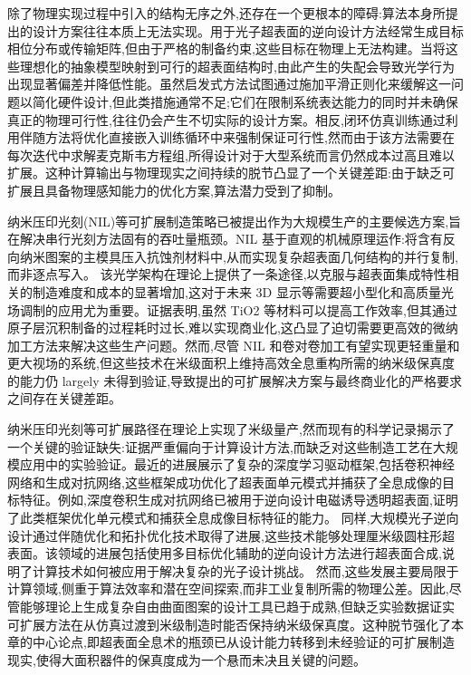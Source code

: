 除了物理实现过程中引入的结构无序之外,还存在一个更根本的障碍:算法本身所提出的设计方案往往本质上无法实现。用于光子超表面的逆向设计方法经常生成目标相位分布或传输矩阵,但由于严格的制备约束,这些目标在物理上无法构建。当将这些理想化的抽象模型映射到可行的超表面结构时,由此产生的失配会导致光学行为出现显著偏差并降低性能。虽然启发式方法试图通过施加平滑正则化来缓解这一问题以简化硬件设计,但此类措施通常不足;它们在限制系统表达能力的同时并未确保真正的物理可行性,往往仍会产生不切实际的设计方案。相反,闭环仿真训练通过利用伴随方法将优化直接嵌入训练循环中来强制保证可行性,然而由于该方法需要在每次迭代中求解麦克斯韦方程组,所得设计对于大型系统而言仍然成本过高且难以扩展。这种计算输出与物理现实之间持续的脱节凸显了一个关键差距:由于缺乏可扩展且具备物理感知能力的优化方案,算法潜力受到了抑制。\citep{doi_10_48550_arxiv_2505_18377_a6fc9ec3}

纳米压印光刻(NIL)等可扩展制造策略已被提出作为大规模生产的主要候选方案,旨在解决串行光刻方法固有的吞吐量瓶颈。NIL 基于直观的机械原理运作:将含有反向纳米图案的主模具压入抗蚀剂材料中,从而实现复杂超表面几何结构的并行复制,而非逐点写入。\citep{doi_10_3390_encyclopedia5040197_fe6bfdc9} \citep{doi_10_5772_intechopen_72534_9965e900} 该光学架构在理论上提供了一条途径,以克服与超表面集成特性相关的制造难度和成本的显著增加,这对于未来 3D 显示等需要超小型化和高质量光场调制的应用尤为重要。证据表明,虽然 TiO2 等材料可以提高工作效率,但其通过原子层沉积制备的过程耗时过长,难以实现商业化,这凸显了迫切需要更高效的微纳加工方法来解决这些生产问题。然而,尽管 NIL 和卷对卷加工有望实现更轻重量和更大视场的系统,但这些技术在米级面积上维持高效全息重构所需的纳米级保真度的能力仍 largely 未得到验证,导致提出的可扩展解决方案与最终商业化的严格要求之间存在关键差距。\citep{doi_10_1515_nanoph_2025_0269_b999ce93}

纳米压印光刻等可扩展路径在理论上实现了米级量产,然而现有的科学记录揭示了一个关键的验证缺失:证据严重偏向于计算设计方法,而缺乏对这些制造工艺在大规模应用中的实验验证。最近的进展展示了复杂的深度学习驱动框架,包括卷积神经网络和生成对抗网络,这些框架成功优化了超表面单元模式并捕获了全息成像的目标特征。例如,深度卷积生成对抗网络已被用于逆向设计电磁诱导透明超表面,证明了此类框架优化单元模式和捕获全息成像目标特征的能力。\citep{doi_10_1088_1402_4896_acf007_ad71688e} 同样,大规模光子逆向设计通过伴随优化和拓扑优化技术取得了进展,这些技术能够处理厘米级圆柱形超表面。该领域的进展包括使用多目标优化辅助的逆向设计方法进行超表面合成,说明了计算技术如何被应用于解决复杂的光子设计挑战。\citep{doi_10_1117_12_2529823_81c5e659} 然而,这些发展主要局限于计算领域,侧重于算法效率和潜在空间探索,而非工业复制所需的物理公差。因此,尽管能够理论上生成复杂自由曲面图案的设计工具已趋于成熟,但缺乏实验数据证实可扩展方法在从仿真过渡到米级制造时能否保持纳米级保真度。这种脱节强化了本章的中心论点,即超表面全息术的瓶颈已从设计能力转移到未经验证的可扩展制造现实,使得大面积器件的保真度成为一个悬而未决且关键的问题。\citep{doi_10_3390_photonics12100947_b44bdefd} \citep{doi_10_1515_nanoph_2024_0127_c4fd5a12}

